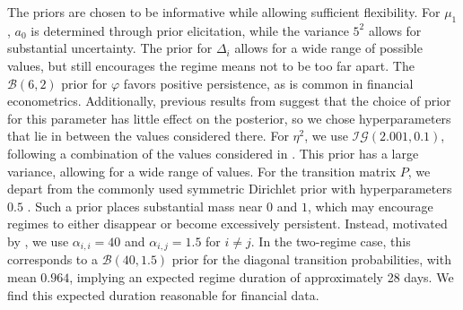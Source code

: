 The priors are chosen to be informative while allowing sufficient flexibility. For $\mu_1$, $a_0$ is determined through prior elicitation, while the variance $5^2$ allows for substantial uncertainty. The prior for $\Delta_i$ allows for a wide range of possible values, but still encourages the regime means not to be too far apart. The $\mathcal{B}(6,2)$ prior for $\varphi$ favors positive persistence, as is common in financial econometrics. Additionally, previous results from \cite{pan2013testing} suggest that the choice of prior for this parameter has little effect on the posterior, so we chose hyperparameters that lie in between the values considered there.
For $\eta^2$, we use $\mathcal{IG}(2.001,0.1)$, following a combination of the values considered in \cite{carvalho2007simulation,pan2013testing}. This prior has a large variance, allowing for a wide range of values.
For the transition matrix $P$, we depart from the commonly used symmetric Dirichlet prior with hyperparameters $0.5$ \cite{so1998stochastic,carvalho2007simulation,pan2013testing}. Such a prior places substantial mass near $0$ and $1$, which may encourage regimes to either disappear or become excessively persistent. Instead, motivated by \cite{shibata2005bayesian}, we use $\alpha_{i,i}=40$ and $\alpha_{i,j}=1.5$ for $i\neq j$. In the two-regime case, this corresponds to a $\mathcal{B}(40,1.5)$ prior for the diagonal transition probabilities, with mean $0.964$, implying an expected regime duration of approximately 28 days. We find this expected duration reasonable for financial data.
